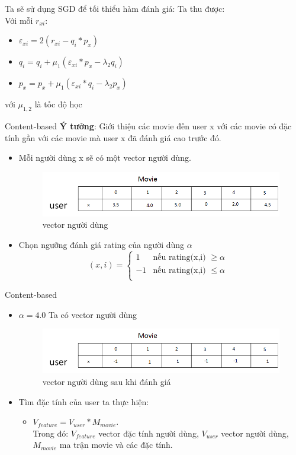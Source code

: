 \documentclass{beamer}
\newcommand{\bi}{\begin{itemize}}
\newcommand{\ei}{\end{itemize}}
\begin{document}
\begin{frame}
Ta sẽ sử dụng SGD để tối thiểu hàm đánh giá:
Ta thu được: \\
Với mỗi $r_{xi}:$
\begin{itemize}
\item $\varepsilon_{xi} =2(r_{xi}-q_i*p_x)$
\item $q_i=q_i+\mu_1(\varepsilon_{xi}*p_x-\lambda_2q_i)$
\item $p_x=p_x+\mu_1(\varepsilon_{xi}*q_i-\lambda_2p_x)$

\end{itemize}
với $\mu_{1,2}$ là tốc độ học 
\end{frame}



\begin{frame}{Content-based}
\textbf{Ý tưởng}: Giới thiệu các movie đến user x với các movie có đặc tính gần với các movie mà user x đã đánh giá cao trước đó.
\bi
\item Mỗi người dùng x sẽ có một vector người dùng.
\begin{figure}[h]
\begin{center}
\includegraphics[width =0.7 \textwidth]{img1.png}
\caption{vector người dùng}
\end{center}
\end{figure}
\item Chọn ngưỡng đánh giá rating của người dùng $\alpha$
\begin{displaymath}
(x,i) = \left\{ \begin{array}{ll}
1 & \textrm{nếu rating(x,i) $\geq \alpha $}\\
-1 & \textrm{nếu rating(x,i) $\le \alpha$ }\\
\end{array} \right.
\end{displaymath}
\ei
\end{frame}
\begin{frame}{Content-based}
\bi
\item $\alpha = 4.0$ Ta có vector người dùng
\begin{figure}[h]
\begin{center}
\includegraphics[width =0.7 \textwidth]{img2.png}
\caption{vector người dùng sau khi đánh giá}
\end{center}
\end{figure}
\item Tìm đặc tính của user ta thực hiện:
\bi
\item  $V_{feature}  =  V_{user} * M_{movie}$. \\
Trong đó: $V_{feature}$ vector đặc tính người dùng, $V_{user}$ vector người dùng, $M_{movie}$ ma trận movie và các đặc tính.
\ei
\ei
\end{frame}
\end{document}
